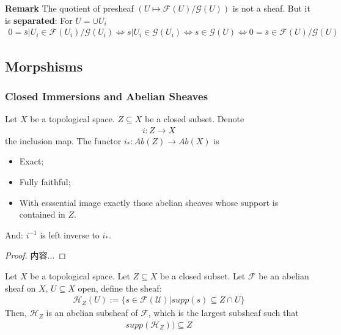 \documentclass[Total.tex]{subfiles}
\begin{document}
			\textbf{Remark} The quotient of presheaf $(U\mapsto \mathcal{F}(U)/\mathcal{G}(U))$ is not a sheaf. But it is \textbf{separated}: For $U=\cup U_i$
			\begin{gather*}
				0=\bar{s}|U_i\in \mathcal{F}(U_i)/\mathcal{G}(U_i)\Leftrightarrow s|U_i\in \mathcal{G}(U_i)\Leftrightarrow  s\in \mathcal{G}(U)\Leftrightarrow 0=\bar{s}\in \mathcal{F}(U)/\mathcal{G}(U)
			\end{gather*}
			
		\subsection{Morpshisms}
		\subsubsection{Closed Immersions and Abelian Sheaves}
		
		\begin{lemma}
			Let $X$ be a topological space. $Z\subseteq X$ be a closed subset. Denote
			\begin{gather*}
				i:Z\rightarrow X
			\end{gather*}
			the inclusion map. The functor $i_*:Ab(Z)\rightarrow Ab(X)$ is
			\begin{itemize}
				\item Exact;
				\item Fully faithful;
				\item With esssential image exactly those abelian sheaves whose support is contained in $Z$.
			\end{itemize}
			And: $i^{-1}$ is left inverse to $i_*$.
		\end{lemma}
		\begin{proof}
			内容...
		\end{proof}
		
		\begin{Def}
			Let $X$ be a topological space. Let $Z\subseteq X$ be a closed subset. Let $\mathcal{F}$ be an abelian sheaf on $X$, $U\subseteq X$ open, define the sheaf:
			\begin{gather*}
				\mathcal{H}_Z(U):=\{s\in \mathcal{F(U)}|supp(s)\subseteq Z\cap U\}
			\end{gather*}
			Then, $\mathcal{H}_Z$ is an abelian subsheaf of $\mathcal{F}$, which is the largest subsheaf such that 
			\begin{gather*}
				supp(\mathcal{H}_Z))\subseteq Z
			\end{gather*}
		\end{Def}
		
\end{document}
